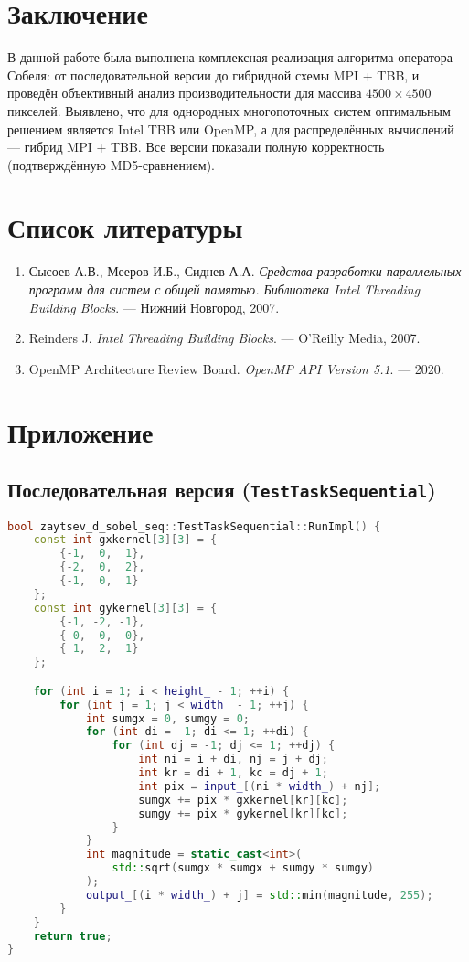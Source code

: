 \documentclass[12pt]{article}
\begin{document}
\section{Заключение}

В данной работе была выполнена комплексная реализация алгоритма оператора Собеля: от последовательной версии до гибридной схемы MPI + TBB, и проведён объективный анализ производительности для массива $4500\times4500$ пикселей. Выявлено, что для однородных многопоточных систем оптимальным решением является Intel TBB или OpenMP, а для распределённых вычислений — гибрид MPI + TBB. Все версии показали полную корректность (подтверждённую MD5-сравнением).

\section{Список литературы}
\begin{enumerate}
 \item Сысоев А.В., Мееров И.Б., Сиднев А.А. \textit{Средства разработки параллельных программ для систем с общей памятью. Библиотека Intel Threading Building Blocks}. — Нижний Новгород, 2007.
 \item Reinders J. \textit{Intel Threading Building Blocks}. — O’Reilly Media, 2007.
 \item OpenMP Architecture Review Board. \textit{OpenMP API Version 5.1}. — 2020.
\end{enumerate}

\newpage
\appendix
\section{Приложение}

\subsection{Последовательная версия (\texttt{TestTaskSequential})}

\begin{lstlisting}[language=C++, caption={Последовательная реализация оператора Собеля}]
bool zaytsev_d_sobel_seq::TestTaskSequential::RunImpl() {
    const int gxkernel[3][3] = {
        {-1,  0,  1},
        {-2,  0,  2},
        {-1,  0,  1}
    };
    const int gykernel[3][3] = {
        {-1, -2, -1},
        { 0,  0,  0},
        { 1,  2,  1}
    };

    for (int i = 1; i < height_ - 1; ++i) {
        for (int j = 1; j < width_ - 1; ++j) {
            int sumgx = 0, sumgy = 0;
            for (int di = -1; di <= 1; ++di) {
                for (int dj = -1; dj <= 1; ++dj) {
                    int ni = i + di, nj = j + dj;
                    int kr = di + 1, kc = dj + 1;
                    int pix = input_[(ni * width_) + nj];
                    sumgx += pix * gxkernel[kr][kc];
                    sumgy += pix * gykernel[kr][kc];
                }
            }
            int magnitude = static_cast<int>(
                std::sqrt(sumgx * sumgx + sumgy * sumgy)
            );
            output_[(i * width_) + j] = std::min(magnitude, 255);
        }
    }
    return true;
}
\end{lstlisting}
\end{document}
